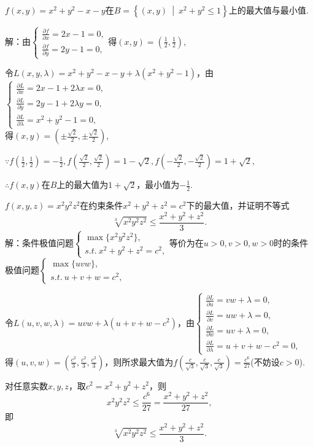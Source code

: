 \documentclass[12pt,UTF8]{ctexart}
\newcommand\Set[2]{\left\{#1\ \middle\vert\ #2 \right\}}
\begin{document}
\begin{enumerate}
$f(x,y)=x^2+y^2-x-y$在$B=\Set{(x,y)}{x^2+y^2\leq1}$上的最大值与最小值.

解：由$\begin{cases}
\frac{\partial f}{\partial x}=2x-1=0,\\
\frac{\partial f}{\partial y}=2y-1=0,
\end{cases}$得$(x,y)=(\frac12,\frac12)$,

令$L(x,y,\lambda)=x^2+y^2-x-y+\lambda(x^2+y^2-1)$，由$\begin{cases}
\frac{\partial L}{\partial x}=2x-1+2\lambda x=0,\\
\frac{\partial L}{\partial y}=2y-1+2\lambda y=0,\\
\frac{\partial L}{\partial\lambda}=x^2+y^2-1=0,
\end{cases}$\\
得$(x,y)=(\pm\frac{\sqrt2}2,\pm\frac{\sqrt2}2)$,

$\because f(\frac12,\frac12)=-\frac12,f(\frac{\sqrt2}2,\frac{\sqrt2}2)=1-\sqrt2,f(-\frac{\sqrt2}2,-\frac{\sqrt2}2)=1+\sqrt2$,

$\therefore f(x,y)$在$B$上的最大值为$1+\sqrt2$，最小值为$-\frac12$.

$f(x,y,z)=x^2y^2z^2$在约束条件$x^2+y^2+z^2=c^2$下的最大值，并证明不等式
\[
\sqrt[3]{x^2y^2z^2}\leq\frac{x^2+y^2+z^2}3.
\]
解：条件极值问题$\begin{cases}
\max\{x^2y^2z^2\},\\
s.t.\ x^2+y^2+z^2=c^2,
\end{cases}$等价为在$u>0,v>0,w>0$时的条件极值问题$\begin{cases}
\max\{uvw\},\\
s.t.\ u+v+w=c^2,
\end{cases}$

令$L(u,v,w,\lambda)=uvw+\lambda(u+v+w-c^2)$，由$\begin{cases}
\frac{\partial L}{\partial u}=vw+\lambda=0,\\
\frac{\partial L}{\partial v}=uw+\lambda=0,\\
\frac{\partial L}{\partial w}=uv+\lambda=0,\\
\frac{\partial L}{\partial\lambda}=u+v+w-c^2=0,
\end{cases}$\\
得$(u,v,w)=(\frac{c^2}3,\frac{c^2}3,\frac{c^2}3)$，则所求最大值为$f(\frac{c}{\sqrt3},\frac{c}{\sqrt3},\frac{c}{\sqrt3})=\frac{c^6}{27}$(不妨设$c>0$).

对任意实数$x,y,z$，取$c^2=x^2+y^2+z^2$，则
\[x^2y^2z^2\leq\frac{c^6}{27}=\frac{x^2+y^2+z^2}{27},\]
即
\[\sqrt[3]{x^2y^2z^2}\leq\frac{x^2+y^2+z^2}3.\]


\end{enumerate}
\end{document}
